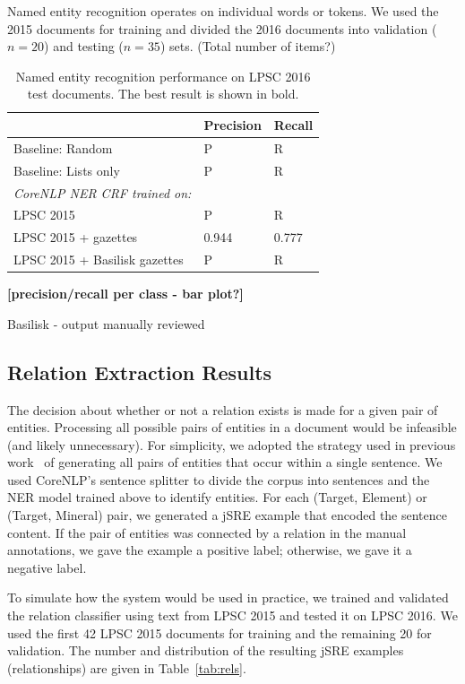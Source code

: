 \documentclass[letterpaper]{article} %
\begin{document}
Named entity recognition operates on individual words or tokens.  We
used the 2015 documents for training and divided the 2016 documents
into validation ($n=20$) and testing ($n=35$) sets.  (Total number of
items?) 

\begin{table}
\caption{Named entity recognition performance on LPSC 2016 test documents.  
The best result is shown in bold.}
\label{tab:ner}
\begin{center}
\begin{tabular}{l|ll}
 & Precision & Recall \\ \hline
Baseline: Random & P & R \\
Baseline: Lists only & P & R \\ \hline
{\em CoreNLP NER CRF trained on:} & & \\
LPSC 2015 & P & R \\
LPSC 2015 + gazettes & 0.944 & 0.777 \\
LPSC 2015 + Basilisk gazettes & P & R \\
\hline
\end{tabular}
\end{center}
\end{table}

{\bf [precision/recall per class - bar plot?]}

Basilisk - output manually reviewed

\subsection{Relation Extraction Results}

The decision about whether or not a relation exists is made for a
given pair of entities.  Processing all possible pairs of entities in
a document would be infeasible (and likely unnecessary).  For
simplicity, we adopted the strategy used in previous
work~\cite{giuliano:jsre06} of generating all pairs of entities that
occur within a single sentence.  We used CoreNLP's sentence splitter
to divide the corpus into sentences and the NER model trained above to
identify entities.  For each (Target, Element) or (Target, Mineral)
pair, we generated a jSRE example that encoded the sentence content.
If the pair of entities was connected by a relation in the manual
annotations, we gave the example a positive label; otherwise, we gave
it a negative label.

To simulate how the system would be used in practice, we trained and
validated the relation classifier using text from LPSC 2015 and tested
it on LPSC 2016.  We used the first 42 LPSC 2015 documents for
training and the remaining 20 for validation.  The number and
distribution of the resulting jSRE examples (relationships) are given
in Table~\ref{tab:rels}.  
\end{document}
